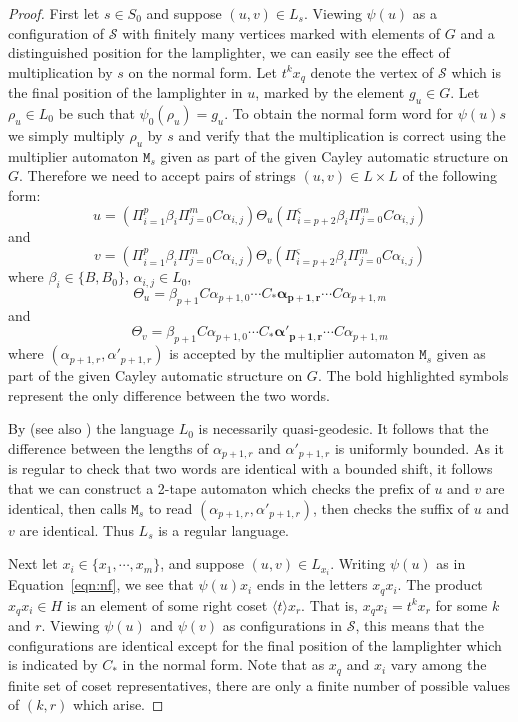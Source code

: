 \documentclass[11pt]{amsart}
\newcommand{\cC}{\varsigma}
\theoremstyle{definition}
\begin{document}
\begin{proof}
First let $s \in S_0$ and 
suppose $(u,v) \in L_s$.
Viewing $\psi(u)$ as a {configuration} of ${\mathcal S}$ with finitely many vertices marked with elements of $G$
and a distinguished position for the lamplighter,
we can easily see the effect of multiplication  by $s$ on the normal form.
Let $t^kx_q$ denote the vertex of ${\mathcal S}$ which is the final position of the lamplighter in $u$, marked by the element  $g_u \in G$. Let $\rho_u\in L_0$ be such that $\psi_0(\rho_u)=g_u$.
To obtain the normal form word for $\psi(u)s$ we simply multiply $\rho_u$ by $s$ and verify that the multiplication is correct using the multiplier automaton $\texttt{M}_s$ given as part of the given Cayley automatic structure on $G$.
Therefore we need to accept pairs of strings $(u,v) \in L \times L$ of the following form:
\begin{dmath*}
u = \left(\Pi_{i=1}^{p}  \beta_i \Pi_{j=0}^m C \alpha_{i,j}\right)
\Theta_u
\left(\Pi_{i=p+2}^{\cC}  \beta_i   \Pi_{j=0}^m C \alpha_{i,j}\right)
\end{dmath*}
and
\begin{dmath*}
v = \left(\Pi_{i=1}^{p}  \beta_i   \Pi_{j=0}^m C \alpha_{i,j}\right)
\Theta_v
\left(\Pi_{i=p+2}^{\cC}  \beta_i  \Pi_{j=0}^m C \alpha_{i,j}\right)
\end{dmath*}
where $\beta_i \in \{B,B_0\}$, $\alpha_{i,j} \in L_0$,
\[
\Theta_u =  \beta_{p+1}  C\alpha_{p+1,0} \cdots C_* \bm{\alpha_{p+1,r}} \cdots C\alpha_{p+1,m}
\]
and
\[
\Theta_v = \beta_{p+1}  C\alpha_{p+1,0} \cdots C_* \bm{\alpha'_{p+1,r}} \cdots C\alpha_{p+1,m}
\]
where $(\alpha_{p+1,r},\alpha'_{p+1,r})$ is accepted by the multiplier automaton $\texttt{M}_s$ given as part of the given Cayley automatic structure on $G$.  The bold highlighted symbols represent the only difference between the two words.


By
\cite{KKMjournal} (see also \cite[Lemma 8]{cga})  the  language $L_0$ is necessarily quasi-geodesic.
It follows that the difference between the lengths of
$\alpha_{p+1,r}$ and $ \alpha'_{p+1,r}$ is uniformly bounded.
As it is regular to check that two words are identical with a bounded shift, 
it follows that we can construct a 2-tape automaton which checks the prefix of $u$ and $v$ are identical, then calls   $\texttt{M}_s$ to read $(\alpha_{p+1,r},\alpha'_{p+1,r})$, then checks the suffix of $u$ and $v$ are identical.
Thus 
 $L_s$ is a regular language.

Next let $x_i \in \{x_1, \cdots ,x_m\}$, and 
suppose $(u,v) \in L_{x_i}$.
Writing $\psi(u)$ as in Equation~\eqref{eqn:nf}, we see that $\psi(u)x_i$ ends in the letters $x_qx_i$.
The product $x_qx_i \in H$ is an element of some right coset $\langle t \rangle x_r$.  That is, $x_qx_i = t^kx_r$ for some $k$ and $r$.
Viewing $\psi(u)$ and $\psi(v)$ as configurations in ${\mathcal S}$, this means that the configurations are identical except for the final position of the lamplighter which is indicated by $C_*$ in the normal form.
Note that as $x_q$ and $x_i$ vary among the finite set of coset representatives, there are only a finite number of possible values of $(k,r)$ which arise.





\end{proof}
\end{document}
